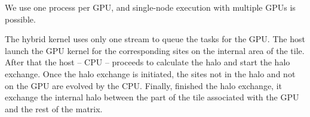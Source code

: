 We use one process per GPU, and single-node execution with multiple GPUs is possible.

The hybrid kernel uses only one stream to queue the tasks for the GPU. The host launch the GPU kernel for the corresponding sites on the internal area of the tile. After that the host -- CPU -- proceeds to calculate the halo and start the halo exchange. Once the halo exchange is initiated, the sites not in the halo and not on the GPU are evolved by the CPU. Finally, finished the halo exchange, it exchange the internal halo between the part of the tile associated with the GPU and the rest of the matrix.